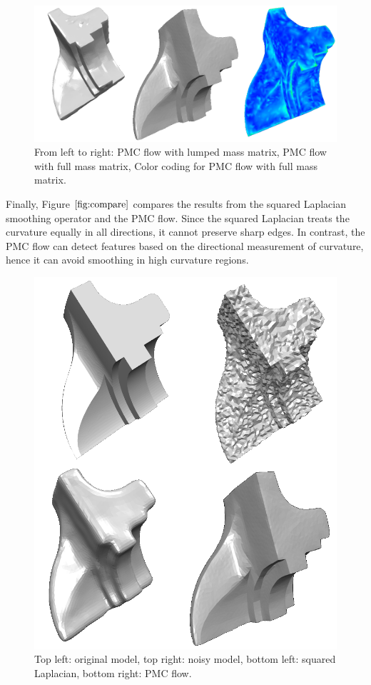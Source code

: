 \documentclass[11pt]{article}
\begin{document}
\begin{figure}[htbp]
\centering
\includegraphics[width=\textwidth]{results.png}
\caption{From left to right: PMC flow with lumped mass matrix, PMC flow with full mass matrix, Color coding for PMC flow with full mass matrix.}
\label{fig:results}
\end{figure}

Finally, Figure $\ref{fig:compare}$ compares the results from the squared Laplacian smoothing operator and the PMC flow. Since the squared Laplacian treats the curvature equally in all directions, it cannot preserve sharp edges. In contrast, the PMC flow can detect features based on the directional measurement of curvature, hence it can avoid smoothing in high curvature regions.

\begin{figure}[htbp]
\centering
\includegraphics[width=\textwidth]{amc_laplacian.png}
\caption{Top left: original model, top right: noisy model, bottom left: squared Laplacian, bottom right: PMC flow.}
\label{fig:compare}
\end{figure}
\end{document}
